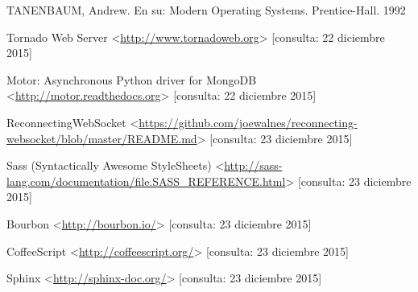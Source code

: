 \begin{thebibliography}{9}
    TANENBAUM, Andrew.
    En su: Modern Operating Systems.
    Prentice-Hall.
    1992

    Tornado Web Server
    <\url{http://www.tornadoweb.org}>
    [consulta: 22 diciembre 2015]

    Motor: Asynchronous Python driver for MongoDB
    <\url{http://motor.readthedocs.org}>
    [consulta: 22 diciembre 2015]

    ReconnectingWebSocket
    <\url{https://github.com/joewalnes/reconnecting-websocket/blob/master/README.md}>
    [consulta: 23 diciembre 2015]

    Sass (Syntactically Awesome StyleSheets)
    <\url{http://sass-lang.com/documentation/file.SASS_REFERENCE.html}>
    [consulta: 23 diciembre 2015]

    Bourbon
    <\url{http://bourbon.io/}>
    [consulta: 23 diciembre 2015]

    CoffeeScript
    <\url{http://coffeescript.org/}>
    [consulta: 23 diciembre 2015]

    Sphinx
    <\url{http://sphinx-doc.org/}>
    [consulta: 23 diciembre 2015]

\end{thebibliography}
